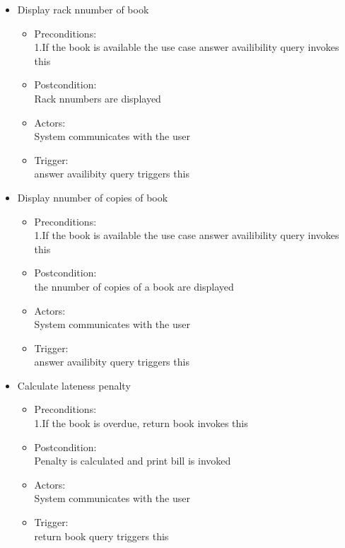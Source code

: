 \documentclass[a4paper]{article}
\begin{document}
\begin{enumerate}
\begin{itemize}
\item Display rack nnumber of book\\ 
	\begin{itemize}
	\item  Preconditions:\\ 1.If the book is available the use case answer availibility query invokes this\\ 
 \item Postcondition:\\  Rack nnumbers are displayed\\ 
 \item Actors:\\  System communicates with the user\\ 
 \item Trigger:\\  answer availibity query triggers this\\ 
	\end{itemize}
 
 \item Display nnumber of copies of book\\ 
	\begin{itemize}
	\item  Preconditions:\\ 1.If the book is available the use case answer availibility query invokes this\\ 
 \item Postcondition:\\  the nnumber of copies of a book are displayed\\ 
 \item Actors: \\ System communicates with the user\\ 
 \item Trigger:\\  answer availibity query triggers this\\ 
	\end{itemize}

\item Calculate lateness penalty\\ 
	\begin{itemize}
	\item  Preconditions:\\ 1.If the book is overdue, return book invokes this\\ 
 \item Postcondition:\\ Penalty is calculated and print bill is invoked\\ 
 \item Actors: \\ System communicates with the user\\ 
 \item Trigger: \\ return book query triggers this\\ 
	\end{itemize}
 

\end{itemize}
\end{enumerate}
\end{document}
